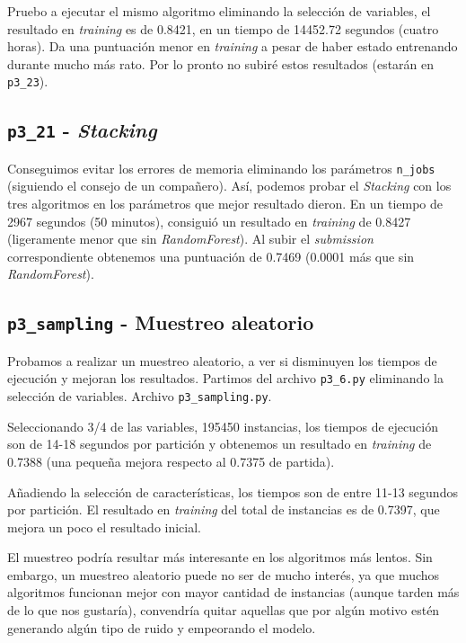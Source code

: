 \documentclass[a4paper, 20pt]{article}
\begin{document}
Pruebo a ejecutar el mismo algoritmo eliminando la selección de variables, el resultado en \textit{training} es de 0.8421, en un tiempo de 14452.72 segundos (cuatro horas). Da una puntuación menor en \textit{training} a pesar de haber estado entrenando durante mucho más rato. Por lo pronto no subiré estos resultados (estarán en \texttt{p3\_23}). 

\subsection{\texttt{p3\_21} - \textit{Stacking}}

Conseguimos evitar los errores de memoria eliminando los parámetros \texttt{n\_jobs} (siguiendo el consejo de un compañero). Así, podemos probar el \textit{Stacking} con los tres algoritmos en los parámetros que mejor resultado dieron. En un tiempo de 2967 segundos (50 minutos), consiguió un resultado en \textit{training} de 0.8427 (ligeramente menor que sin \textit{RandomForest}). Al subir el \textit{submission} correspondiente obtenemos una puntuación de 0.7469 (0.0001 más que sin \textit{RandomForest}).

\subsection{\texttt{p3\_sampling} - Muestreo aleatorio}

Probamos a realizar un muestreo aleatorio, a ver si disminuyen los tiempos de ejecución y mejoran los resultados. Partimos del archivo \texttt{p3\_6.py} eliminando la selección de variables. Archivo \texttt{p3\_sampling.py}.

Seleccionando 3/4 de las variables, 195450 instancias, los tiempos de ejecución son de 14-18 segundos por partición y obtenemos un resultado en \textit{training} de 0.7388 (una pequeña mejora respecto al 0.7375 de partida).

Añadiendo la selección de características, los tiempos son de entre 11-13 segundos por partición. El resultado en \textit{training} del total de instancias es de 0.7397, que mejora un poco el resultado inicial.

El muestreo podría resultar más interesante en los algoritmos más lentos. Sin embargo, un muestreo aleatorio puede no ser de mucho interés, ya que muchos algoritmos funcionan mejor con mayor cantidad de instancias (aunque tarden más de lo que nos gustaría), convendría quitar aquellas que por algún motivo estén generando algún tipo de ruido y empeorando el modelo.
\end{document}
